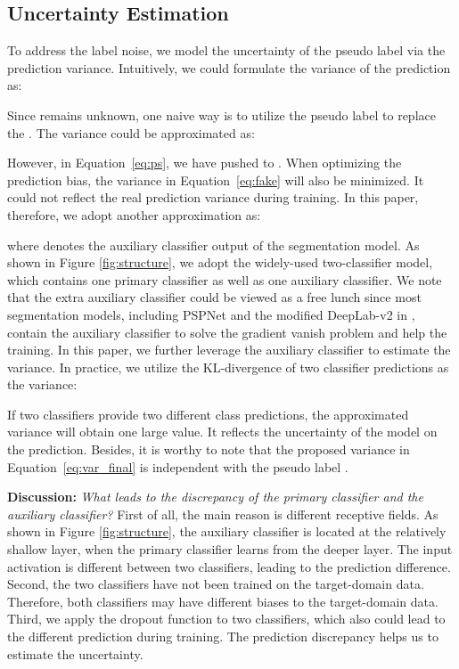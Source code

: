 \subsection{Uncertainty Estimation} \label{sec:ue}


To address the label noise, we model the uncertainty of the pseudo label via the prediction variance. Intuitively, we could formulate the variance of the prediction as: 

Since  remains unknown, one naive way is to utilize the pseudo label  to replace the . The variance could be approximated as:

However, in Equation~\ref{eq:ps}, we have pushed  to . When optimizing the prediction bias, the variance in Equation~\ref{eq:fake} will also be minimized. It could not reflect the real prediction variance during training. In this paper, therefore, we adopt another approximation as: 

where  denotes the auxiliary classifier output of the segmentation model. As shown in Figure \ref{fig:structure}, we adopt the widely-used two-classifier model, which contains one primary classifier as well as one auxiliary classifier. We note that the extra auxiliary classifier could be viewed as a free lunch since most segmentation models, including PSPNet \cite{zhao2017pyramid} and the modified DeepLab-v2 in \cite{tsai2018learning,tsai2019domain,luo2019significance,zheng2019unsupervised},  contain the auxiliary classifier to solve the gradient vanish problem \cite{he2016identity} and help the training. In this paper, we further leverage the auxiliary classifier to estimate the variance. In practice, we utilize the KL-divergence of two classifier predictions as the variance:

If two classifiers provide two different class predictions, the approximated variance will obtain one large value. It reflects the uncertainty of the model on the prediction. Besides, it is worthy to note that the proposed variance in Equation~\ref{eq:var_final} is independent with the pseudo label .

\noindent\textbf{Discussion:} \emph{What leads to the discrepancy of the primary classifier and the auxiliary classifier?} First of all, the main reason is different receptive fields. As shown in Figure \ref{fig:structure}, the auxiliary classifier is located at the relatively shallow layer, when the primary classifier learns from the deeper layer. The input activation is different between two classifiers, leading to the prediction difference. Second, the two classifiers have not been trained on the target-domain data. Therefore, both classifiers may have different biases to the target-domain data. Third, we apply the dropout function \cite{srivastava2014dropout} to two classifiers, which also could lead to the different prediction during training. The prediction discrepancy helps us to estimate the uncertainty.

